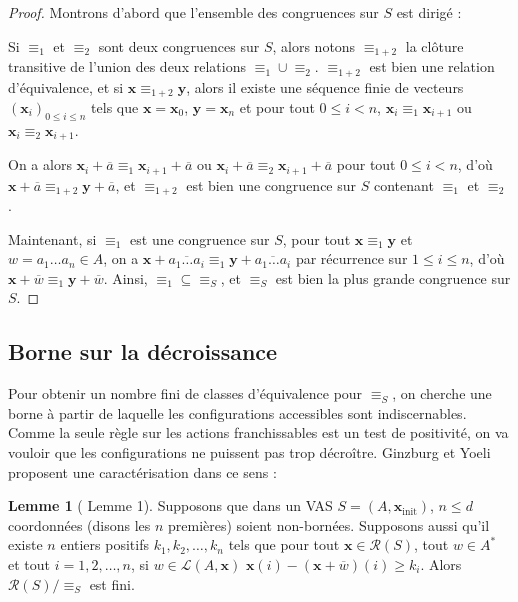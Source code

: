 \documentclass[a4paper,final]{article}
\theoremstyle{definition}
\newtheorem{Lemma}[Theorem]{Lemme}
\let\leq\leqslant
\let\geq\geqslant
\let\union\cup
\newcommand{\lang}{\ensuremath{\mathcal{L}}}
\newcommand{\conf}{\ensuremath{\mathcal{R}}}
\newcommand{\vect}[1]{\ensuremath{\mathbf{#1}}}
\newcommand{\rel}{\ensuremath{\equiv}}
\newcommand{\xinit}{\ensuremath{\vect{x}_\text{init}}}
\newcommand{\valeur}[1]{\ensuremath{\overline{#1}}}
\begin{document}
\begin{proof}
Montrons d'abord que l'ensemble des congruences sur $S$ est dirigé :

Si $\rel_1$ et $\rel_2$ sont deux congruences sur $S$, alors notons $\rel_{1+2}$ la clôture transitive de l'union des deux relations $\rel_1\union\rel_2$.
$\rel_{1+2}$ est bien une relation d'équivalence, 
et si $\vect{x}\rel_{1+2}\vect{y}$, alors il existe une séquence finie de vecteurs ${(\vect{x}_i)}_{0\leq i\leq n}$ tels que 
$\vect{x}=\vect{x}_0$, $\vect{y}=\vect{x}_n$ et pour tout $0\leq i<n$, $\vect{x}_i\rel_1\vect{x}_{i+1}$ ou $\vect{x}_i\rel_2\vect{x}_{i+1}$.

On a alors $\vect{x}_i +\valeur{a} \rel_1 \vect{x}_{i+1} +\valeur{a}$ ou $\vect{x}_i +\valeur{a} \rel_2 \vect{x}_{i+1} +\valeur{a}$ pour tout $0\leq i<n$, 
d'où $\vect{x} +\valeur{a} \rel_{1+2} \vect{y} +\valeur{a}$, 
et $\rel_{1+2}$ est bien une congruence sur $S$ contenant $\rel_1$ et $\rel_2$.

Maintenant, si $\rel_1$ est une congruence sur $S$, pour tout $\vect{x}\rel_1\vect{y}$ et $w=a_1\dots a_n\in A$, on a 
$\vect{x} +\valeur{a_1\dots a_i} \rel_1\vect{y} +\valeur{a_1\dots a_i}$ par récurrence sur $1\leq i\leq n$, d'où $\vect{x} +\valeur{w} \rel_1\vect{y} +\valeur{w}$.
Ainsi, $\rel_1\subseteq \rel_S$, et $\rel_S$ est bien la plus grande congruence sur $S$.
\end{proof}

\color{black} %


\subsection{Borne sur la décroissance}

Pour obtenir un nombre fini de classes d'équivalence pour $\rel_S$, on cherche une borne à partir de laquelle les configurations accessibles sont indiscernables.
Comme la seule règle sur les actions franchissables est un test de positivité, on va vouloir que les configurations ne puissent pas trop décroître.
Ginzburg et Yoeli proposent une caractérisation dans ce sens :


\begin{Lemma}[\cite{giyo80} Lemme 1]
    Supposons que dans un VAS $S=(A,\xinit)$, $n\leq d$ coordonnées (disons les $n$ premières) soient non-bornées.
    Supposons aussi qu'il existe $n$ entiers positifs $k_1,k_2,\dots,k_n$ tels que pour tout $\vect{x}\in\conf(S)$, tout $w\in A^\ast$ et tout $i=1,2,\dots,n$, 
    si $w\in\lang(A,\vect{x})$ 
    $\vect{x}(i) - (\vect{x} +\valeur{w})(i)\geq k_i$.
    Alors $\conf(S)/\rel_S$ est fini.
\end{Lemma}
\end{document}
